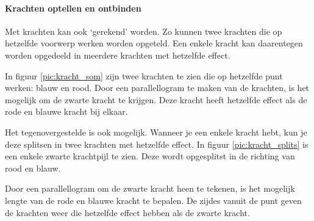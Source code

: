 \paragraph{Krachten optellen en ontbinden}
Met krachten kan ook `gerekend' worden. Zo kunnen twee krachten die op hetzelfde voorwerp werken worden opgeteld. Een enkele kracht kan daarentegen worden opgedeeld in meerdere krachten met hetzelfde effect.

In figuur \ref{pic:kracht_som} zijn twee krachten te zien die op hetzelfde punt werken: blauw en rood. Door een parallellogram te maken van de krachten, is het mogelijk om de zwarte kracht te krijgen. Deze kracht heeft hetzelfde effect als de rode en blauwe kracht bij elkaar.

Het tegenovergestelde is ook mogelijk. Wanneer je een enkele kracht hebt, kun je deze splitsen in twee krachten met hetzelfde effect. In figuur \ref{pic:kracht_splits} is een enkele zwarte krachtpijl te zien. Deze wordt opgesplitst in de richting van rood en blauw.

Door een parallellogram om de zwarte kracht heen te tekenen, is het mogelijk lengte van de rode en blauwe kracht te bepalen. De zijdes vanuit de punt geven de krachten weer die hetzelfde effect hebben als de zwarte kracht.



